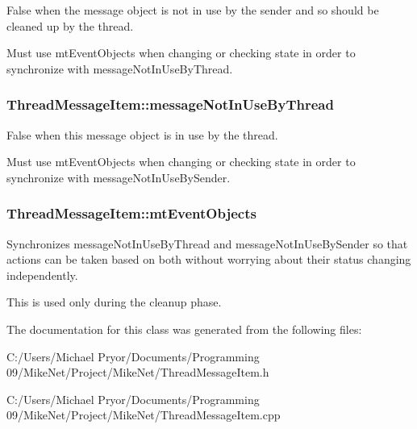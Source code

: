 False when the message object is not in use by the sender and so should be cleaned up by the thread. 

Must use mtEventObjects when changing or checking state in order to synchronize with messageNotInUseByThread. \hypertarget{class_thread_message_item_a9cf19e411c1f07bd18849a9668d810b1}{
\subsubsection[{messageNotInUseByThread}]{ {\bf ThreadMessageItem::messageNotInUseByThread}}}
\label{class_thread_message_item_a9cf19e411c1f07bd18849a9668d810b1}


False when this message object is in use by the thread. 

Must use mtEventObjects when changing or checking state in order to synchronize with messageNotInUseBySender. \hypertarget{class_thread_message_item_a8904b4b9c74de4de6eee493b8dd92801}{
\subsubsection[{mtEventObjects}]{ {\bf ThreadMessageItem::mtEventObjects}}}
\label{class_thread_message_item_a8904b4b9c74de4de6eee493b8dd92801}


Synchronizes messageNotInUseByThread and messageNotInUseBySender so that actions can be taken based on both without worrying about their status changing independently. 

This is used only during the cleanup phase. 

The documentation for this class was generated from the following files:\begin{DoxyCompactItemize}
\item 
C:/Users/Michael Pryor/Documents/Programming 09/MikeNet/Project/MikeNet/ThreadMessageItem.h\item 
C:/Users/Michael Pryor/Documents/Programming 09/MikeNet/Project/MikeNet/ThreadMessageItem.cpp\end{DoxyCompactItemize}
